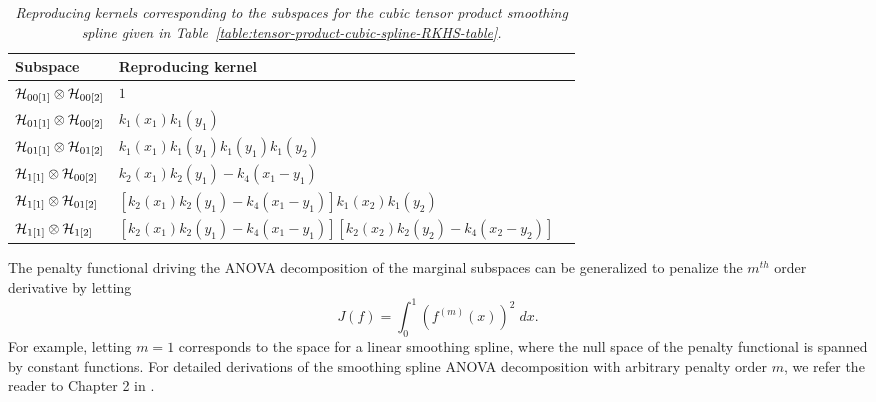 \begin{table}[H]
\centering %
\begin{tabular}{lll} %
\hline 
\hline %
Subspace 	& 		Reproducing kernel 		 \\
\hline %
$\mathcal{H}_{00\left[1\right]} \otimes \mathcal{H}_{00\left[2\right]}$ & 	$1$	\\ [1ex] 
$\mathcal{H}_{01\left[1\right]} \otimes \mathcal{H}_{00\left[2\right]} $& 	$k_1\left(x_1\right)k_1\left(y_1\right)$	\\ [1ex] 
$\mathcal{H}_{01\left[1\right]} \otimes \mathcal{H}_{01\left[2\right]}$ & 	$k_1\left(x_1\right)k_1\left(y_1\right)k_1\left(y_1\right)k_1\left(y_2\right)$ \\ [1ex] 
$\mathcal{H}_{1\left[1\right]} \otimes \mathcal{H}_{00\left[2\right]}$  	& 	$k_2\left(x_1\right)k_2\left(y_1\right) - k_4\left(x_1 - y_1\right)$	\\ [1ex] 
$\mathcal{H}_{1\left[1\right]} \otimes \mathcal{H}_{01\left[2\right]}$ 	& 	$\left[k_2\left(x_1\right)k_2\left(y_1\right) - k_4\left(x_1 - y_1\right)\right]k_1\left(x_2\right)k_1\left(y_2\right)$ \\ [1ex]  
$\mathcal{H}_{1\left[1\right]} \otimes \mathcal{H}_{1\left[2\right]}$  & $\left[k_2\left(x_1\right)k_2\left(y_1\right) - k_4\left(x_1 - y_1\right)\right]\left[k_2\left(x_2\right)k_2\left(y_2\right) - k_4\left(x_2 - y_2\right)\right]$	\\ [1ex]  
\hline %
\hline %
\end{tabular}
\caption{\textit{Reproducing kernels corresponding to the subspaces for the cubic tensor product smoothing spline given in Table~\ref{table:tensor-product-cubic-spline-RKHS-table}.}} %
\label{table:tensor-product-cubic-spline-RK-table}
\end{table}


The penalty functional driving the ANOVA decomposition of the marginal subspaces can be generalized to penalize the $m^{th}$ order derivative by letting
\[
J\left(f\right) = \int_0^1  \left(f^{\left(m\right)}\left(x\right)\right)^2\;dx.
\]
\noindent
For example, letting $m = 1$ corresponds to the space for a linear smoothing spline, where the null space of the penalty functional is spanned by constant functions. For detailed derivations of the smoothing spline ANOVA decomposition with arbitrary penalty order $m$, we refer the reader to Chapter 2 in \cite{gu2013smoothing}. 



